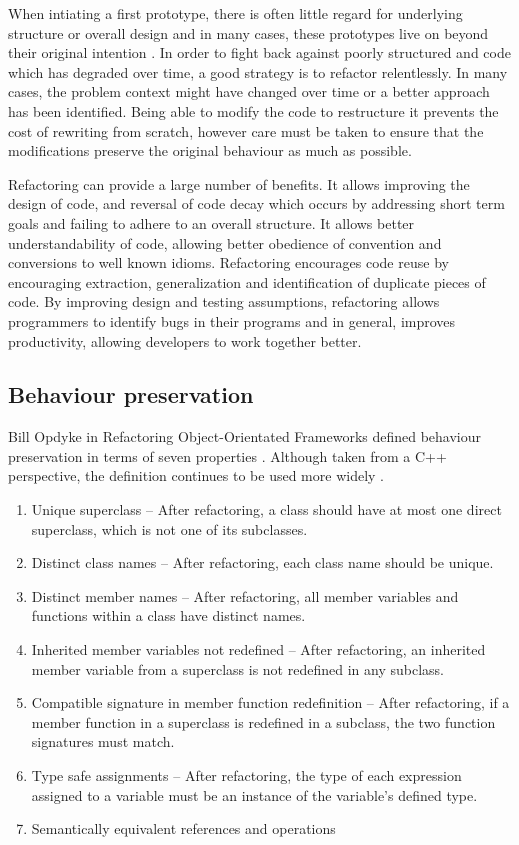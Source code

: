 When intiating a first prototype, there is often little regard for underlying structure or overall design and in many cases, these prototypes live on beyond their original intention \cite{foote1997big}. In order to fight back against poorly structured and code which has degraded over time, a good strategy is to refactor relentlessly. In many cases, the problem context might have changed over time or a better approach has been identified. Being able to modify the code to restructure it prevents the cost of rewriting from scratch, however care must be taken to ensure that the modifications preserve the original behaviour as much as possible.

Refactoring can provide a large number of benefits. It allows improving the design of code, and reversal of code decay which occurs by addressing short term goals and failing to adhere to an overall structure. It allows better understandability of code, allowing better obedience of convention and conversions to well known idioms. Refactoring encourages code reuse by encouraging extraction, generalization and identification of duplicate pieces of code. By improving design and testing assumptions, refactoring allows programmers to identify bugs in their programs and in general, improves productivity, allowing developers to work together better.

\subsection{Behaviour preservation}
Bill Opdyke in Refactoring Object-Orientated Frameworks defined behaviour preservation in terms of seven properties \cite{opdyke1992refactoring}. Although taken from a C++ perspective, the definition continues to be used more widely \cite{schafer2010specification}.

\begin{enumerate}
\item Unique superclass -- After refactoring, a class should have at most one direct superclass, which is not one of its subclasses.
\item Distinct class names -- After refactoring, each class name should be unique.
\item Distinct member names --  After refactoring, all member variables and functions within a class have distinct names.
\item Inherited member variables not redefined -- After refactoring, an inherited member variable from a superclass is not redefined in any subclass.
\item Compatible signature in member function redefinition -- After refactoring, if a member function in a superclass is redefined in a subclass, the two function signatures must match.
\item Type safe assignments -- After refactoring, the type of each expression assigned to a variable must be an instance of the variable's defined type.
\item Semantically equivalent references and operations
\end{enumerate}

